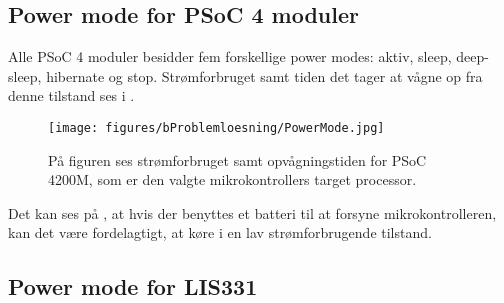 \subsection{Power mode for PSoC 4 moduler}
Alle PSoC 4 moduler besidder fem forskellige power modes: aktiv, sleep, deep-sleep, hibernate og stop. Strømforbruget samt tiden det tager at vågne op fra denne tilstand ses i . 
\begin{figure}[H]
	\centering
	\texttt{[image: figures/bProblemloesning/PowerMode.jpg]}
	\caption{På figuren ses strømforbruget samt opvågningstiden for PSoC 4200M, som er den valgte mikrokontrollers target processor.}
	\label{fig:Powermode}
\end{figure}\vspace{-0.2cm}
Det kan ses på , at hvis der benyttes et batteri til at forsyne mikrokontrolleren, kan det være fordelagtigt, at køre i en lav strømforbrugende tilstand. %

\subsection{Power mode for LIS331}
